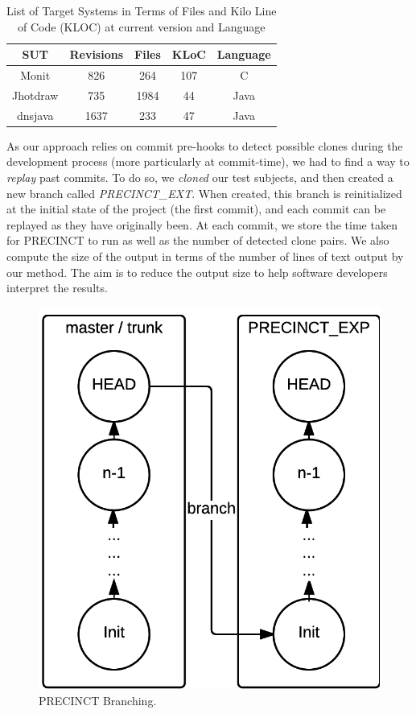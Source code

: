 \documentclass[12pt]{report}
\begin{document}
\begin{table}[]
\centering
\caption{List of Target Systems in Terms of Files and Kilo Line of Code (KLOC) at current version and Language}
\label{tab:precinct-sut}
\begin{tabular}{c|c|c|c|c}
SUT        & Revisions & Files & KLoC & Language \\ \hline\hline
Monit      & 826       & 264   & 107  & C        \\ \hline
Jhotdraw   & 735       & 1984  & 44   & Java     \\ \hline
dnsjava    & 1637      & 233   & 47   & Java     \\ \hline
\end{tabular}
\end{table}

As our approach relies on commit pre-hooks to detect possible clones
during the development process (more particularly at commit-time), we
had to find a way to \emph{replay} past commits. To do so, we
\emph{cloned} our test subjects, and then created a new branch called
\emph{PRECINCT\_EXT}. When created, this branch is reinitialized at the
initial state of the project (the first commit), and each commit can be
replayed as they have originally been. At each commit, we store the time
taken for PRECINCT to run as well as the number of detected clone pairs.
We also compute the size of the output in terms of the number of lines
of text output by our method. The aim is to reduce the output size to
help software developers interpret the results.

\begin{figure}
  \centering
  \includegraphics[width=0.5\linewidth]{media/chap5/branch.png}
  \caption{PRECINCT Branching.\label{fig:precinct-branching}}
\end{figure}
\end{document}
